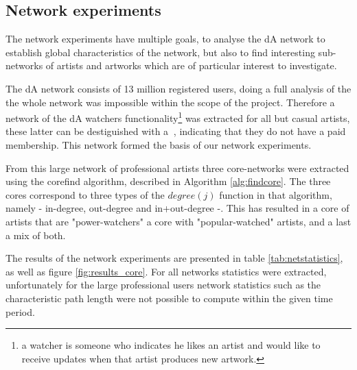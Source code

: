 \subsection{Network experiments}
The network experiments have multiple goals, to analyse the dA network to establish global characteristics of the network, but also to find interesting sub-networks of artists and artworks which are of particular interest to investigate.

The dA network consists of 13 million registered users, doing a full analysis of the the whole network was impossible within the scope of the project. Therefore a network of the dA watchers functionality\footnote{a watcher is someone who indicates he likes an artist and would like to receive updates when that artist produces new artwork.} was extracted for all but casual artists, these latter can be destiguished with a $~$, indicating that they do not have a paid membership. This network formed the basis of our network experiments.

From this large network of professional artists three core-networks were extracted using the corefind algorithm, described in Algorithm \ref{alg:findcore}. The three cores correspond to three types of the $degree(j)$ function in that algorithm, namely - in-degree, out-degree and in+out-degree -. This has resulted in a core of artists that are "power-watchers" a core with "popular-watched" artists, and a last a mix of both.

The results of the network experiments are presented in table \ref{tab:netstatistics}, as well as figure \ref{fig:results_core}.  For all networks statistics were extracted, unfortunately for the large professional users network statistics such as the characteristic path length were not possible to compute within the given time period.

